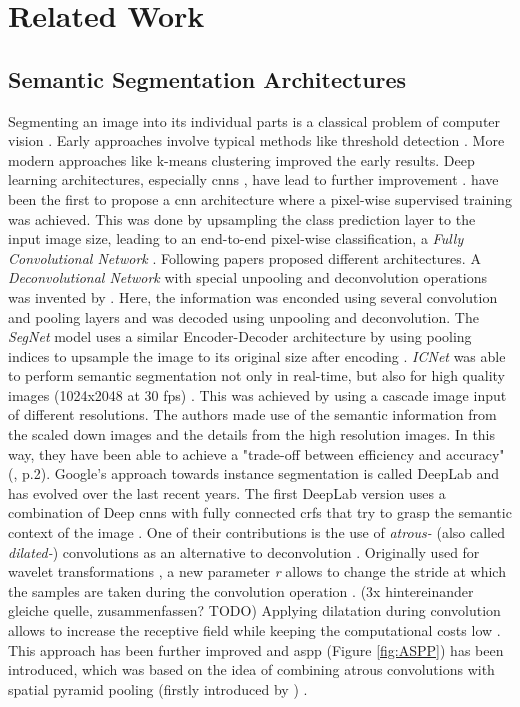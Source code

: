 \documentclass[11pt,
  paper=a4, 
  bibliography=totocnumbered,
	captions=tableheading,
	BCOR=10mm
]{scrreprt}
\theoremstyle{definition}
\newcommand{\figref}[1]{(Figure \ref{#1})}
\begin{document}
\section{Related Work} \label{sec:related_work}

\subsection{Semantic Segmentation Architectures}\label{sec:SemanticSegmentation}

Segmenting an image into its individual parts is a classical problem of computer vision \cite{Szeliski2011}. 
Early approaches involve typical methods like threshold detection \cite{Smith1979}.
More modern approaches like k-means clustering \cite{Dhanachandra2015} improved the early results.
Deep learning architectures, especially \glspl{cnn} \cite{Fukushima1980}, have lead to further improvement \cite{Minaee2020}.
\textcite{Shelhamer2014} have been the first to propose a \gls{cnn} architecture where a pixel-wise supervised training was achieved. 
This was done by upsampling the class prediction layer to the input image size, leading to an end-to-end pixel-wise classification, a \textit{Fully Convolutional Network} \cite{Shelhamer2014}.
Following papers proposed different architectures.
A \textit{Deconvolutional Network} with special unpooling and deconvolution operations was invented by \textcite{Noh2015}. 
Here, the information was enconded using several convolution and pooling layers and was decoded using unpooling and deconvolution.
The \textit{SegNet} model uses a similar Encoder-Decoder architecture by using pooling indices to upsample the image to its original size after encoding \cite{Badrinarayanan2017}.
\textit{ICNet} was able to perform semantic segmentation not only in real-time, but also for high quality images (1024x2048 at 30 fps) \cite{Zhao2017}. 
This was achieved by using a cascade image input of different resolutions. 
The authors made use of the semantic information from the scaled down images and the details from the high resolution images.
In this way, they have been able to achieve a "trade-off between efficiency and accuracy" (\cite{Zhao2017}, p.2).
Google's approach towards instance segmentation is called DeepLab and has evolved over the last recent years.
The first DeepLab version uses a combination of Deep \glspl{cnn} with fully connected \glspl{crf} \cite{Lafferty1999} that try to grasp the semantic context of the image \cite{Chen2016}. 
One of their contributions is the use of \textit{atrous-} (also called \textit{dilated-}) convolutions as an alternative to deconvolution \cite{Chen2016}.
Originally used for wavelet transformations \cite{Mallat1999}, a new parameter \textit{r} allows to change the stride at which the samples are taken during the convolution operation \cite{Chen2016}. (3x hintereinander gleiche quelle, zusammenfassen? TODO)
Applying dilatation during convolution allows to increase the receptive field while keeping the computational costs low \cite{Minaee2020}.
This approach has been further improved and \Gls{aspp} \figref{fig:ASPP} has been introduced, which was based on the idea of combining atrous convolutions with spatial pyramid pooling (firstly introduced by \textcite{He2014}) \cite{Chen2018}.
\end{document}
